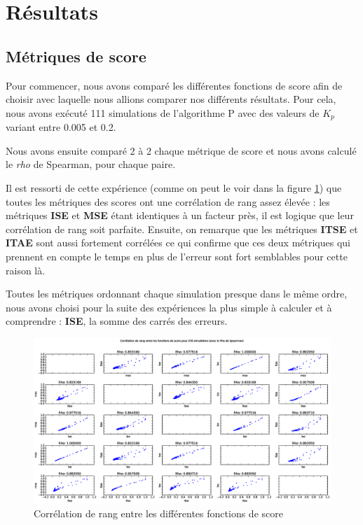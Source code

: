 \documentclass[a4paper,10pt]{report}
\begin{document}
\section{Résultats}

\subsection{Métriques de score}

Pour commencer, nous avons comparé les différentes fonctions de score afin de choisir avec laquelle nous allions comparer nos différents résultats. Pour cela, nous avons exécuté 111 simulations de l'algorithme P avec des valeurs de $K_p$ variant entre 0.005 et 0.2.

Nous avons ensuite comparé 2 à 2 chaque métrique de score et nous avons calculé le \textit{rho} de Spearman, pour chaque paire.

Il est ressorti de cette expérience (comme on peut le voir dans la figure \ref{fig:correlation}) que toutes les métriques des scores ont une corrélation de rang assez élevée :
les métriques \textbf{ISE} et \textbf{MSE} étant identiques à un facteur près, il est logique que leur corrélation de rang soit parfaite.
Ensuite, on remarque que les métriques \textbf{ITSE} et \textbf{ITAE} sont aussi fortement corrélées ce qui confirme que ces deux métriques qui prennent en compte le temps en plus de l'erreur sont fort semblables pour cette raison là.

Toutes les métriques ordonnant chaque simulation presque dans le même ordre,
nous avons choisi pour la suite des expériences la plus simple à calculer et à comprendre :
\textbf{ISE}, la somme des carrés des erreurs.

\begin{figure}[hb!]
   \centering
   \includegraphics[scale=0.35]{correlation.eps}
   \caption{\label{fig:correlation} Corrélation de rang entre les différentes fonctions de score}
\end{figure}
\end{document}
